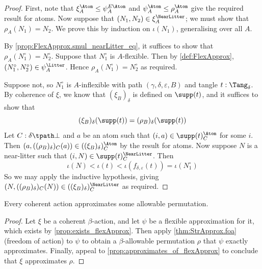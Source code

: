 \begin{proof}
  \leanok
  First, note that \( \xi_A^\Atom \leq \psi_A^{E\Atom} \) and \( \psi_A^\Atom \leq \rho_A^\Atom \) give the required result for atoms.
  Now suppose that \( (N_1, N_2) \in \xi_A^\NearLitter \); we must show that \( \rho_A(N_1) = N_2 \).
  We prove this by induction on \( \iota(N_1) \), generalising over all \( A \).

  By \cref{prop:FlexApprox.smul_nearLitter_eq}, it suffices to show that \( \rho_A(N_1^\circ) = N_2^\circ \).
  Suppose that \( N_1^\circ \) is \( A \)-flexible.
  Then by \cref{def:FlexApprox}, \( (N_1^\circ, N_2^\circ) \in \psi_A^\Litter \).
  Hence \( \rho_A(N_1^\circ) = N_2^\circ \) as required.

  Suppose not, so \( N_1^\circ \) is \( A \)-inflexible with path \( (\gamma,\delta,\varepsilon,B) \) and tangle \( t : \Tang_\delta \).
  By coherence of \( \xi \), we know that \( (\xi_B)_\delta \) is defined on \( \supp(t) \), and it suffices to show that
  \[ (\xi_B)_\delta(\supp(t)) = (\rho_B)_\delta(\supp(t)) \]
  Let \( C : \delta \tpath \bot \) and \( a \) be an atom such that \( (i, a) \in \supp(t)_C^\Atom \) for some \( i \).
  Then \( (a, ((\rho_B)_\delta)_C(a)) \in ((\xi_B)_\delta)_C^\Atom \) by the result for atoms.
  Now suppose \( N \) is a near-litter such that \( (i, N) \in \supp(t)_C^\NearLitter \).
  Then
  \[ \iota(N) < \iota(t) < \iota(f_{\delta,\varepsilon}(t)) = \iota(N_1^\circ) \]
  So we may apply the inductive hypothesis, giving \( (N, ((\rho_B)_\delta)_C(N)) \in ((\xi_B)_\delta)_C^\NearLitter \) as required.
\end{proof}
\begin{theorem}
  \label{thm:StrAction.foa}
  \leanok
  Every coherent action approximates some allowable permutation.
\end{theorem}
\begin{proof}
  \leanok
  Let \( \xi \) be a coherent \( \beta \)-action, and let \( \psi \) be a flexible approximation for it, which exists by \cref{prop:exists_flexApprox}.
  Then apply \cref{thm:StrApprox.foa} (freedom of action) to \( \psi \) to obtain a \( \beta \)-allowable permutation \( \rho \) that \( \psi \) exactly approximates.
  Finally, appeal to \cref{prop:approximates_of_flexApprox} to conclude that \( \xi \) approximates \( \rho \).
\end{proof}


